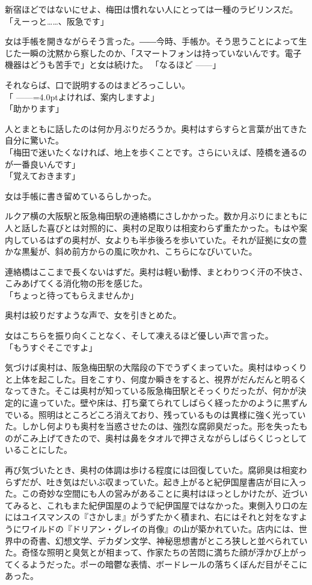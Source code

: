 \documentclass[b5j,twoside,twocolumn]{utarticle}
\begin{document}
新宿ほどではないにせよ、梅田は慣れない人にとっては一種のラビリンスだ。\\
「えーっと……、阪急です」　


女は手帳を開きながらそう言った。――今時、手帳か。そう思うことによって生じた一瞬の沈黙から察したのか、「スマートフォンは持っていないんです。電子機器はどうも苦手で」と女は続けた。
「なるほど\tbaselineshift =2.5pt ------\tbaselineshift =4.0pt」


それならば、口で説明するのはまどろっこしい。\\
「\tbaselineshift =2.5pt ------\tbaselineshift =4.0ptよければ、案内しますよ」\\
「助かります」


人とまともに話したのは何か月ぶりだろうか。奥村はすらすらと言葉が出てきた自分に驚いた。\\
「梅田で迷いたくなければ、地上を歩くことです。さらにいえば、陸橋を通るのが一番良いんです」\\
「覚えておきます」


女は手帳に書き留めているらしかった。


ルクア横の大阪駅と阪急梅田駅の連絡橋にさしかかった。数か月ぶりにまともに人と話した喜びとは対照的に、奥村の足取りは相変わらず重たかった。もはや案内しているはずの奥村が、女よりも半歩後ろを歩いていた。それが証拠に女の豊かな黒髪が、斜め前方からの風に吹かれ、こちらになびいていた。


連絡橋はここまで長くないはずだ。奥村は軽い動悸、まとわりつく汗の不快さ、こみあげてくる消化物の形を感じた。\\
「ちょっと待ってもらえませんか」


奥村は絞りだすような声で、女を引きとめた。


女はこちらを振り向くことなく、そして凍えるほど優しい声で言った。\\
「もうすぐそこですよ」


気づけば奥村は、阪急梅田駅の大階段の下でうずくまっていた。奥村はゆっくりと上体を起こした。目をこすり、何度か瞬きをすると、視界がだんだんと明るくなってきた。そこは奥村が知っている阪急梅田駅とそっくりだったが、何かが決定的に違っていた。壁や床は、打ち棄てられてしばらく経ったかのように黒ずんでいる。照明はところどころ消えており、残っているものは異様に強く光っていた。しかし何よりも奥村を当惑させたのは、強烈な腐卵臭だった。形を失ったものがこみ上げてきたので、奥村は鼻をタオルで押さえながらしばらくじっとしていることにした。


再び気づいたとき、奥村の体調は歩ける程度には回復していた。腐卵臭は相変わらずだが、吐き気はだいぶ収まっていた。起き上がると紀伊国屋書店が目に入った。この奇妙な空間にも人の営みがあることに奥村はほっとしかけたが、近づいてみると、これもまた紀伊国屋のようで紀伊国屋ではなかった。東側入り口の左にはユイスマンスの『さかしま』がうずたかく積まれ、右にはそれと対をなすようにワイルドの『ドリアン・グレイの肖像』の山が築かれていた。店内には、世界中の奇書、幻想文学、デカダン文学、神秘思想書がところ狭しと並べられていた。奇怪な照明と臭気とが相まって、作家たちの苦悶に満ちた顔が浮かび上がってくるようだった。ポーの暗鬱な表情、ボードレールの落ちくぼんだ目がそこにあった。
\end{document}
